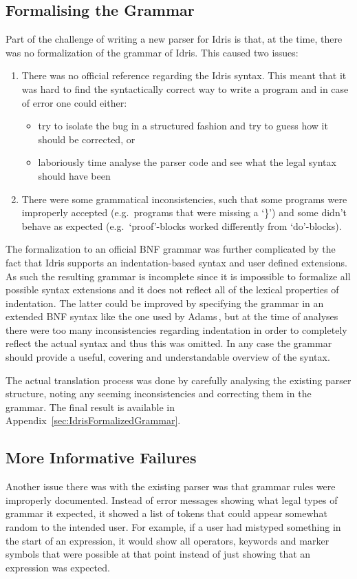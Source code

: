 \documentclass[a4paper]{article}%
\begin{document}
\subsection{Formalising the Grammar}
\label{sub:FormalisingtheGrammar}
Part of the challenge of writing a new parser for Idris is that, at the time, there was no formalization of the grammar of Idris.
This caused two issues:
\begin{enumerate}
  \item There was no official reference regarding the Idris syntax. This meant that it was hard to find the syntactically correct way to write a program and in case of error one could either:
    \begin{itemize}
      \item try to isolate the bug in a structured fashion and try to guess how it should be corrected, or
      \item laboriously time analyse the parser code and see what the legal syntax should have been
    \end{itemize}
\item There were some grammatical inconsistencies, such that some programs were improperly accepted (e.g.\ programs that were missing a `\}') and some didn't behave as expected (e.g.\ `proof'-blocks worked differently from `do'-blocks).
\end{enumerate}

The formalization to an official BNF grammar was further complicated by the fact that Idris supports an indentation-based syntax and user defined extensions.
As such the resulting grammar is incomplete since it is impossible to formalize all possible syntax extensions
and it does not reflect all of the lexical properties of indentation. The latter could be improved by specifying the grammar in an extended BNF syntax like the one used
by Adams\,\cite{adams2013principled}, but at the time of analyses there were too many inconsistencies regarding indentation in order to completely reflect the actual syntax and thus this was omitted.
In any case the grammar should provide a useful, covering and understandable overview of the syntax.

The actual translation process was done by carefully analysing the existing parser structure, noting any seeming inconsistencies and correcting them in the grammar.
The final result is available in Appendix~\ref{sec:IdrisFormalizedGrammar}.

\subsection{More Informative Failures}
\label{sub:DocumentingforFailures}
Another issue there was with the existing parser was that grammar rules were improperly documented. Instead of error messages showing what legal types of grammar it expected, it showed a list of tokens that could appear somewhat random
to the intended user. For example, if a user had mistyped something in the start of an expression, it would show all operators, keywords and marker symbols that were possible at that point instead of just showing that
an expression was expected.
\end{document}
